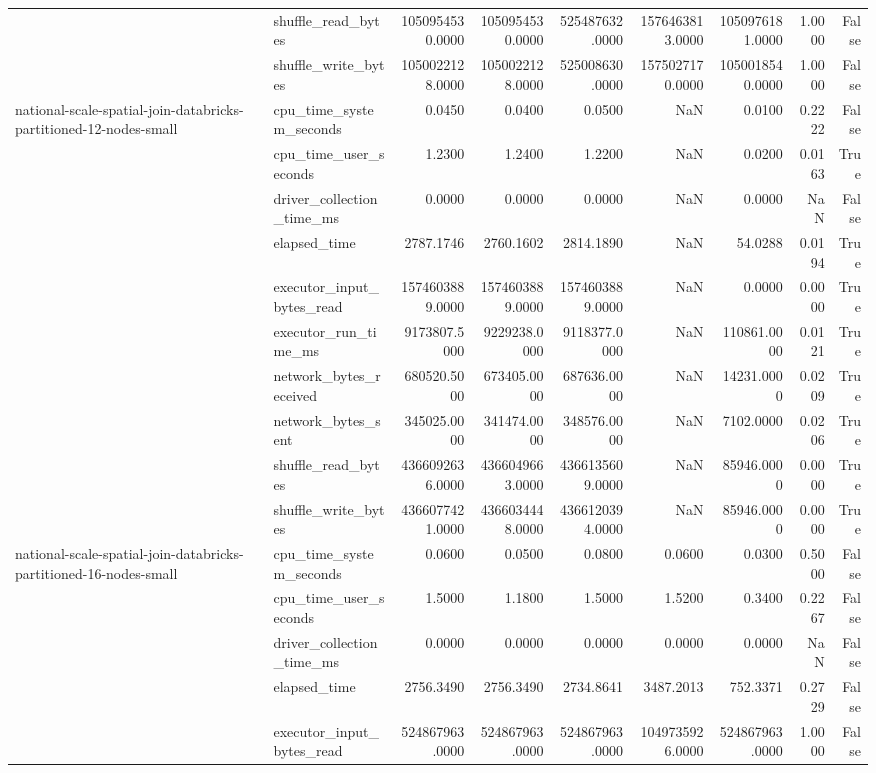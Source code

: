 \begin{tabular}{llrrrrrrr}
 & shuffle\_read\_bytes & 1050954530.0000 & 1050954530.0000 & 525487632.0000 & 1576463813.0000 & 1050976181.0000 & 1.0000 & False \\
 & shuffle\_write\_bytes & 1050022128.0000 & 1050022128.0000 & 525008630.0000 & 1575027170.0000 & 1050018540.0000 & 1.0000 & False \\
\cline{1-9}
\multirow[t]{10}{*}{national-scale-spatial-join-databricks-partitioned-12-nodes-small} & cpu\_time\_system\_seconds & 0.0450 & 0.0400 & 0.0500 & NaN & 0.0100 & 0.2222 & False \\
 & cpu\_time\_user\_seconds & 1.2300 & 1.2400 & 1.2200 & NaN & 0.0200 & 0.0163 & True \\
 & driver\_collection\_time\_ms & 0.0000 & 0.0000 & 0.0000 & NaN & 0.0000 & NaN & False \\
 & elapsed\_time & 2787.1746 & 2760.1602 & 2814.1890 & NaN & 54.0288 & 0.0194 & True \\
 & executor\_input\_bytes\_read & 1574603889.0000 & 1574603889.0000 & 1574603889.0000 & NaN & 0.0000 & 0.0000 & True \\
 & executor\_run\_time\_ms & 9173807.5000 & 9229238.0000 & 9118377.0000 & NaN & 110861.0000 & 0.0121 & True \\
 & network\_bytes\_received & 680520.5000 & 673405.0000 & 687636.0000 & NaN & 14231.0000 & 0.0209 & True \\
 & network\_bytes\_sent & 345025.0000 & 341474.0000 & 348576.0000 & NaN & 7102.0000 & 0.0206 & True \\
 & shuffle\_read\_bytes & 4366092636.0000 & 4366049663.0000 & 4366135609.0000 & NaN & 85946.0000 & 0.0000 & True \\
 & shuffle\_write\_bytes & 4366077421.0000 & 4366034448.0000 & 4366120394.0000 & NaN & 85946.0000 & 0.0000 & True \\
\cline{1-9}
\multirow[t]{10}{*}{national-scale-spatial-join-databricks-partitioned-16-nodes-small} & cpu\_time\_system\_seconds & 0.0600 & 0.0500 & 0.0800 & 0.0600 & 0.0300 & 0.5000 & False \\
 & cpu\_time\_user\_seconds & 1.5000 & 1.1800 & 1.5000 & 1.5200 & 0.3400 & 0.2267 & False \\
 & driver\_collection\_time\_ms & 0.0000 & 0.0000 & 0.0000 & 0.0000 & 0.0000 & NaN & False \\
 & elapsed\_time & 2756.3490 & 2756.3490 & 2734.8641 & 3487.2013 & 752.3371 & 0.2729 & False \\
 & executor\_input\_bytes\_read & 524867963.0000 & 524867963.0000 & 524867963.0000 & 1049735926.0000 & 524867963.0000 & 1.0000 & False \\

\end{tabular}
